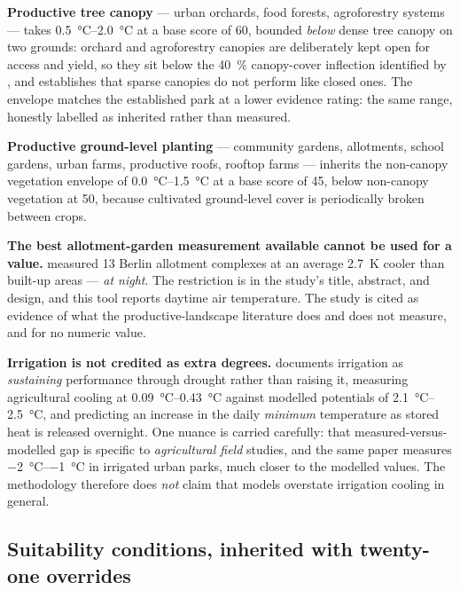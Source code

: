 \textbf{Productive tree canopy} --- urban orchards, food forests, agroforestry
systems --- takes \SIrange{0.5}{2.0}{\degreeCelsius} at a base score of 60,
bounded \emph{below} dense tree canopy on two grounds: orchard and agroforestry
canopies are deliberately kept open for access and yield, so they sit below the
\SI{40}{\percent} canopy-cover inflection identified by \textcite{ziter2019},
and \textcite{colter2019} establishes that sparse canopies do not perform like
closed ones. The envelope matches the established park at a lower evidence
rating: the same range, honestly labelled as inherited rather than measured.

\textbf{Productive ground-level planting} --- community gardens, allotments,
school gardens, urban farms, productive roofs, rooftop farms --- inherits the
non-canopy vegetation envelope of \SIrange{0.0}{1.5}{\degreeCelsius} at a base
score of 45, below non-canopy vegetation at 50, because cultivated ground-level
cover is periodically broken between crops.

\begin{keynote}
\noindent\textbf{The best allotment-garden measurement available cannot be used
for a value.} \textcite{rost2020} measured 13 Berlin allotment complexes at an
average \qty{2.7}{\kelvin} cooler than built-up areas --- \emph{at night}. The
restriction is in the study's title, abstract, and design, and this tool reports
daytime air temperature. The study is cited as evidence of what the
productive-landscape literature does and does not measure, and for no numeric
value.

\textbf{Irrigation is not credited as extra degrees.} \textcite{cheung2022}
documents irrigation as \emph{sustaining} performance through drought rather
than raising it, measuring agricultural cooling at
\SIrange{0.09}{0.43}{\degreeCelsius} against modelled potentials of
\SIrange{2.1}{2.5}{\degreeCelsius}, and predicting an increase in the daily
\emph{minimum} temperature as stored heat is released overnight. One nuance is
carried carefully: that measured-versus-modelled gap is specific to
\emph{agricultural field} studies, and the same paper measures
\SIrange{-2}{-1}{\degreeCelsius} in irrigated urban parks, much closer to the
modelled values. The methodology therefore does \emph{not} claim that models
overstate irrigation cooling in general.
\end{keynote}

\subsection{Suitability conditions, inherited with twenty-one overrides}
\label{sec:suitability}

